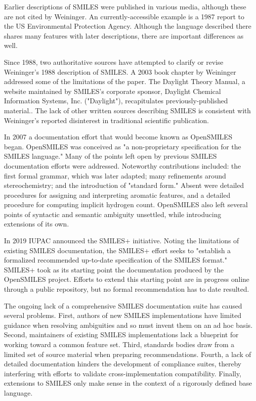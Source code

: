 \documentclass{article}
\begin{document}
Earlier descriptions of SMILES were published in various media, although these are not cited by Weininger. An currently-accessible example is a 1987 report to the US Environmental Protection Agency.\cite{anderson:1987} Although the language described there shares many features with later descriptions, there are important differences as well.

Since 1988, two authoritative sources have attempted to clarify or revise Weininger's 1988 description of SMILES. A 2003 book chapter by Weininger addressed some of the limitations of the paper.\cite{weininger:2008} The Daylight Theory Manual, a website maintained by SMILES's corporate sponsor, Daylight Chemical Information Systems, Inc. ("Daylight"), recapitulates previously-published material.\cite{daylightTheory}. The lack of other written sources describing SMILES is consistent with Weininger's reported disinterest in traditional scientific publication.\cite{gasteiger:2018}

In 2007 a documentation effort that would become known as OpenSMILES began.\cite{openSMILES} OpenSMILES was conceived as "a non-proprietary specification for the SMILES language." Many of the points left open by previous SMILES documentation efforts were addressed. Noteworthy contributions included: the first formal grammar, which was later adapted;\cite{denjoed:2010} many refinements around stereochemistry; and the introduction of "standard form." Absent were detailed procedures for assigning and interpreting aromatic features, and a detailed procedure for computing implicit hydrogen count. OpenSMILES also left several points of syntactic and semantic ambiguity unsettled, while introducing extensions of its own.

In 2019 IUPAC announced the SMILES+ initiative.\cite{smilesPlusSpecification} Noting the limitations of existing SMILES documentation, the SMILES+ effort seeks to "establish a formalized recommended up-to-date specification of the SMILES format." SMILES+ took as its starting point the documentation produced by the OpenSMILES project. Efforts to extend this starting point are in progress online through a public repository, but no formal recommendation has to date resulted.\cite{smilesPlusGitHub}

The ongoing lack of a comprehensive SMILES documentation suite has caused several problems. First, authors of new SMILES implementations have limited guidance when resolving ambiguities and so must invent them on an ad hoc basis. Second, maintainers of existing SMILES implementations lack a blueprint for working toward a common feature set. Third, standards bodies draw from a limited set of source material when preparing recommendations. Fourth, a lack of detailed documentation hinders the development of compliance suites, thereby interfering with efforts to validate cross-implementation compatibility. Finally, extensions to SMILES only make sense in the context of a rigorously defined base language.
\end{document}
